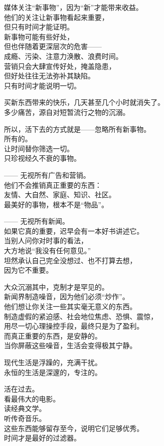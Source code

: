 \documentclass[
]{article}
\begin{document}
媒体关注``新事物''，因为``新''才能带来收益。\\
他们的关注让新事物看起来重要，\\
但只有时间才能证明。\\
新事物可能有些好处，\\
但也伴随着更深层次的危害------\\
成瘾、污染、注意力涣散、浪费时间。\\
营销只会大肆宣传好处，掩盖隐患，\\
但好处往往无法弥补其缺陷。\\
只有时间才能说明一切。

买新东西带来的快乐，几天甚至几个小时就消失了。\\
多少痛苦，源自对短暂流行之物的沉溺。

所以，活下去的方式就是------忽略所有新事物。\\
所有的。\\
让时间替你筛选一切。\\
只珍视经久不衰的事物。

------ 无视所有广告和营销。\\
他们不会推销真正重要的东西：\\
友情、大自然、家庭、知识、社区。\\
最美好的事物，根本不是``物品''。

------ 无视所有新闻。\\
如果它真的重要，迟早会有一本好书讲述它。\\
当别人问你对时事的看法，\\
大方地说``我没有任何意见。''\\
坦然承认自己完全没想过、也不打算去想，\\
因为它不重要。

大众沉溺其中，克制才是罕见的。\\
新闻界制造噪音，因为他们必须``炒作''。\\
他们想让你关注一些其实毫无意义的东西。\\
制造虚假的紧迫感、社会地位焦虑、恐惧、震惊，\\
用尽一切心理操控手段，最终只是为了盈利。\\
而真正重要的东西，是安静的。\\
当你屏蔽这些噪音，生活会变得极其宁静。

现代生活是浮躁的，充满干扰。\\
永恒的生活是深邃的，专注的。

活在过去。\\
看最伟大的电影。\\
读经典文学。\\
听传奇音乐。\\
这些东西能够留存至今，说明它们足够优秀。\\
时间才是最好的过滤器。
\end{document}
